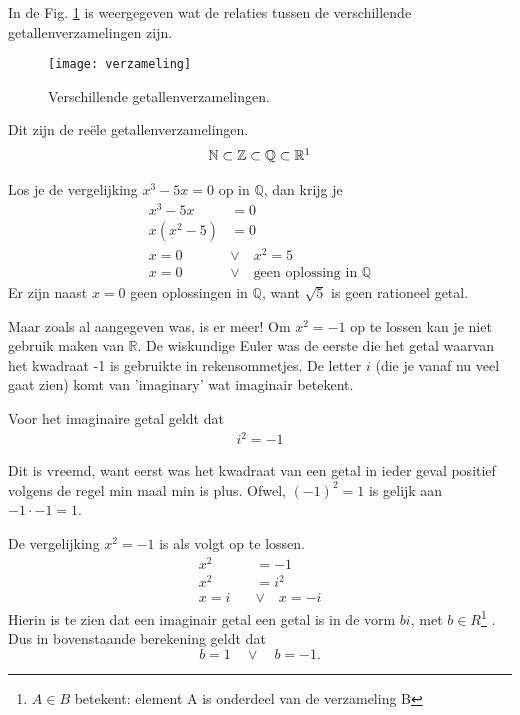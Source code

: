 \documentclass[11pt,fleqn]{book} %
\begin{document}
In de Fig. \ref{fig:verzameling} is weergegeven wat de relaties tussen de verschillende getallenverzamelingen zijn.

\begin{figure}[h]
	\centering\texttt{[image: verzameling]}
	\caption{Verschillende getallenverzamelingen.}
	\label{fig:verzameling}
\end{figure}

\begin{definition}\label{eq:rf}
Dit zijn de reële getallenverzamelingen.
\begin{align}
\mathbb{N} \subset \mathbb{Z} \subset \mathbb{Q} \subset\mathbb{R}\footnotemark
\end{align}
\end{definition}

Los je de vergelijking $x^3-5x=0$ op in $\mathbb{Q}$, dan krijg je
\begin{displaymath}
\begin{aligned}
x^3-5x&=0\\
x(x^2-5)&=0\\
x=0 \quad &\vee \quad x^2=5\\
x=0 \quad &\vee \quad \text{geen oplossing in } \mathbb{Q}
\end{aligned}
\end{displaymath}
Er zijn naast $x=0$ geen oplossingen in $\mathbb{Q}$, want $\sqrt{5}$ is geen rationeel getal.

Maar zoals al aangegeven was, is er meer! Om $x^2=-1$ op te lossen kan je niet gebruik maken van $\mathbb{R}$. De wiskundige Euler was de eerste die het getal waarvan het kwadraat -1 is gebruikte in rekensommetjes. De letter $i$ (die je vanaf nu veel gaat zien) komt van 'imaginary' wat imaginair betekent.
\begin{definition}
Voor het imaginaire getal geldt dat
\begin{align}
i^2  = -1
\end{align}
\end{definition}
Dit is vreemd, want eerst was het kwadraat van een getal in ieder geval positief volgens de regel min maal min is plus. Ofwel, $(-1)^2=1$ is gelijk aan $-1\cdot-1=1$.

De vergelijking $x^2 = -1$ is als volgt op te lossen.
\begin{displaymath}
\begin{aligned}
x^2 &= -1\\
x^2 &= i^2\\
x=i \quad &\vee \quad x=-i
\end{aligned}
\end{displaymath}
Hierin is te zien dat een imaginair getal een getal is in de vorm $bi$, met $b \in R$\footnote{$A \in B$ betekent: element A is onderdeel van de verzameling B} . Dus in bovenstaande berekening geldt dat
\begin{displaymath}
b=1 \quad \vee \quad b=-1.
\end{displaymath}
\end{document}
